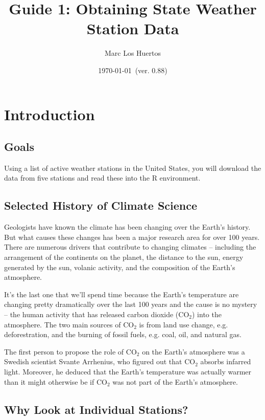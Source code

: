\documentclass{article}\usepackage[]{graphicx}\usepackage[]{xcolor}
\title{Guide 1: Obtaining State Weather Station Data}
\author{Marc Los Huertos}
\date{\today~(ver. 0.88)}
\begin{document}
\maketitle

\section{Introduction}

\subsection{Goals}

Using a list of active weather stations in the United States, you  will download the data from five stations and read these into the R environment. 


\subsection{Selected History of Climate Science}

Geologists have known the climate has been changing over the Earth's history. But what causes these changes has been a major research area for over 100 years. There are numerous drivers that contribute to changing climates -- including the arrangement of the continents on the planet, the distance to the sun, energy generated by the sun, volanic activity, and the composition of the Earth's atmosphere. 

It's the last one that we'll spend time because the Earth's temperature are changing pretty dramatically over the last 100 years and the cause is no mystery -- the human activity that has released carbon dioxide (CO$_2$) into the atmosphere. The two main sources of CO$_2$ is from land use change, e.g. deforestration, and the burning of fossil fuels, e.g. coal, oil, and natural gas. 

The first person to propose the role of CO$_2$ on the Earth's atmosphere was a Swedish scientist Svante Arrhenius, who figured out that CO$_2$ absorbs infarred light. Moreover, he deduced that the Earth's temperature was actually warmer than it might otherwise be if CO$_2$ was not part of the Earth's atmosphere. 

\subsection{Why Look at Individual Stations?}
\end{document}
